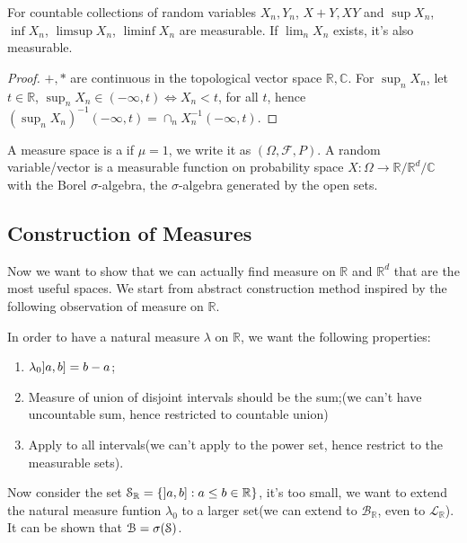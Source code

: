 \begin{thm}[Measurability]
    For countable collections of random variables \(X_{n}, Y_{n}\), \(X +Y, XY\) and \(\sup X_{n}\), \( \inf X_{n}\), \( \limsup X_{n}\), \( \liminf X_{n}\) are measurable. If \(\lim_{n} X_{n}\) exists, it's also measurable.
\end{thm}

\begin{proof}
    \(+, *\) are continuous in the topological vector space \(\mathbb{R}, \mathbb{C}\). 
    For \(\sup_{n} X_{n}\), let \(t \in \mathbb{R}\), \(\sup_{n} X_{n} \in (-\infty, t) \iff X_{n} < t\), for all \(t\), hence \((\sup_{n} X_{n})^{-1}(-\infty, t) = \cap_{n} X_{n} ^{-1} (- \infty, t)\).    
\end{proof}


A measure space is a  if \(\mu =1\), we write it as \((\Omega, \mathcal{F}, P)\). A random variable/vector is a measurable function on probability space \(X: \Omega \to \mathbb{R}/\mathbb{R}^{d}/\mathbb{C}\) with the Borel \(\sigma\)-algebra, the \(\sigma\)-algebra generated by the open sets.

\subsection{Construction of Measures}


Now we want to show that we can actually find measure on \(\mathbb{R}\) and \(\mathbb{R}^{d}\) that are the most useful spaces. We start from abstract construction method inspired by the following observation of measure on \(\mathbb{R}\).

In order to have a natural measure \(\lambda\) on \(\mathbb{R}\), we want the following properties:
\begin{enumerate}
    \item \(\lambda_{0} \linterval{a}{b} = b - a \);
    \item Measure of union of disjoint intervals should be the sum;(we can't have uncountable sum, hence restricted to countable union)
    \item Apply to all intervals(we can't apply to the power set, hence restrict to the measurable sets).
\end{enumerate}

Now consider the set \(\mathcal{S}_{\mathbb{R}} = \Bqty{\linterval{a}{b} : a\leq b \in \mathbb{R}}\), it's too small, we want to extend the natural measure funtion \(\lambda_{0}\) to a larger set(we can extend to \(\mathcal{B}_{\mathbb{R}}\), even to \(\mathcal{L}_{\mathbb{R}}\)). It can be shown that \(\mathcal{B} = \sigma \pqty{\mathcal{S}}\). 


